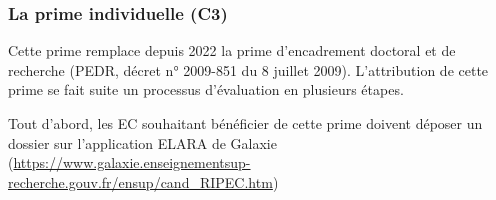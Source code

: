 \subsubsection{La prime individuelle (C3)}

Cette prime remplace depuis 2022 la prime d'encadrement doctoral et de recherche (PEDR, d\'ecret n° 2009-851 du 8 juillet 2009). L'attribution de cette prime se fait suite un processus d'évaluation en plusieurs étapes.

Tout d'abord, les EC souhaitant bénéficier de cette prime doivent déposer un dossier sur l'application ELARA de Galaxie (\url{https://www.galaxie.enseignementsup-recherche.gouv.fr/ensup/cand_RIPEC.htm})

%
%
%
%
